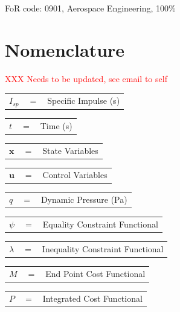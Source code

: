   FoR code: 0901, Aerospace Engineering, 100\%

\tableofcontents

\listoffigures
{}
\listoftables
{}


\section*{Nomenclature}
\textcolor{red}{XXX Needs to be updated, see email to self}


\noindent
\begin{tabular}{p{1.2cm}p{1cm}p{5cm}}
	$I_{sp}$ & $=$ & Specific Impulse (s)\\ 
\end{tabular} 
\begin{tabular}{p{1.2cm}p{1cm}p{5cm}}
	$t$ & $=$ & Time (s)\\
\end{tabular} 
\begin{tabular}{p{1.2cm}p{1cm}p{5cm}}
	$\textbf{x}$& $=$ & State Variables\\
\end{tabular} 
\begin{tabular}{p{1.2cm}p{1cm}p{5cm}}
	$\textbf{u}$& $=$ & Control Variables\\
\end{tabular} 
\begin{tabular}{p{1.2cm}p{1cm}p{5cm}}
	$q$ & $=$ & Dynamic Pressure (Pa)\\
\end{tabular} 
\begin{tabular}{p{1.2cm}p{1cm}p{5cm}}
	$\psi$ & $=$ & Equality Constraint Functional\\
\end{tabular}
\begin{tabular}{p{1.2cm}p{1cm}p{5cm}}
	$\lambda$ & $=$ & Inequality Constraint Functional\\
\end{tabular}
\begin{tabular}{p{1.2cm}p{1cm}p{5cm}}
	$M$ & $=$ & End Point Cost Functional\\
\end{tabular}
\begin{tabular}{p{1.2cm}p{1cm}p{5cm}}
	$P$ & $=$ & Integrated Cost Functional\\
\end{tabular}
